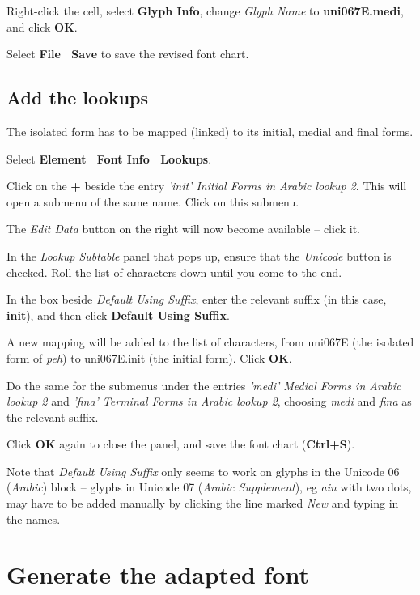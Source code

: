 Right-click the cell, select \textbf{Glyph Info}, change \textit{Glyph Name} to \textbf{uni067E.medi}, and click \textbf{OK}.

Select \textbf{File \textrightarrow\ Save} to save the revised font chart.

\subsection{Add the lookups}

The isolated form has to be mapped (linked) to its initial, medial and final forms.

Select \textbf{Element \textrightarrow\ Font Info \textrightarrow\ Lookups}.

Click on the \textbf{+} beside the entry \textit{'init' Initial Forms in Arabic lookup 2}.  This will open a submenu of the same name.  Click on this submenu.

The \textit{Edit Data} button on the right will now become available -- click it.

In the \textit{Lookup Subtable} panel that pops up, ensure that the \textit{Unicode} button is checked.  Roll the list of characters down until you come to the end.

In the box beside \textit{Default Using Suffix}, enter the relevant suffix (in this case, \textbf{init}), and then click \textbf{Default Using Suffix}.

A new mapping will be added to the list of characters, from uni067E (the isolated form of \textit{peh}) to uni067E.init (the initial form).
Click \textbf{OK}.

Do the same for the submenus under the entries \textit{'medi' Medial Forms in Arabic lookup 2} and \textit{'fina' Terminal Forms in Arabic lookup 2}, choosing \textit{medi} and \textit{fina} as the relevant suffix.

Click \textbf{OK} again to close the panel, and save the font chart (\textbf{Ctrl+S}).

Note that \textit{Default Using Suffix} only seems to work on glyphs in the Unicode 06 (\textit{Arabic}) block -- glyphs in Unicode 07 (\textit{Arabic Supplement}), eg \textit{ain} with two dots, may have to be added manually by clicking the line marked \textit{New} and typing in the names.

\section{Generate the adapted font}

